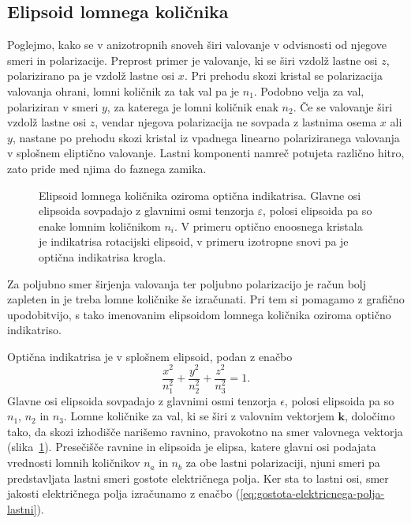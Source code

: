 \subsection*{Elipsoid lomnega količnika}
Poglejmo, kako se v anizotropnih snoveh širi valovanje v odvisnosti
od njegove smeri in polarizacije. Preprost primer je valovanje, ki se širi vzdolž lastne
osi $z$, polarizirano pa je vzdolž lastne osi $x$. Pri prehodu
skozi kristal se polarizacija valovanja ohrani, lomni količnik za
tak val pa je $n_{1}$. Podobno velja za val, polariziran v smeri
$y$, za katerega je lomni količnik enak $n_{2}$. Če se valovanje širi vzdolž lastne
osi $z$, vendar njegova polarizacija ne sovpada z lastnima osema
$x$ ali $y$, nastane po prehodu skozi kristal iz vpadnega linearno polariziranega valovanja
v splošnem eliptično valovanje. Lastni komponenti namreč potujeta različno
hitro, zato pride med njima do faznega zamika.

\begin{figure}[h]
\centering
\def\svgwidth{50truemm} 

\caption{Elipsoid lomnega količnika oziroma optična indikatrisa. Glavne osi
elipsoida sovpadajo z glavnimi osmi tenzorja $\varepsilon$, polosi elipsoida pa so enake
lomnim količnikom $n_i$. V primeru optično enoosnega kristala je indikatrisa  
rotacijski elipsoid, v primeru izotropne snovi pa je optična indikatrisa krogla.}
\label{fig:Indikatrisa}
\end{figure}

Za poljubno smer širjenja valovanja ter poljubno polarizacijo je račun
bolj zapleten in je treba lomne količnike še izračunati. Pri tem si pomagamo 
z grafično upodobitvijo, s tako imenovanim elipsoidom lomnega količnika oziroma
optično indikatriso. 

Optična indikatrisa je v splošnem elipsoid, podan z enačbo
\begin{equation}
\frac{x^{2}}{n_{1}^{2}}+\frac{y^{2}}{n_{2}^{2}}+\frac{z^{2}}{n_{3}^{2}}=1.
\end{equation}
Glavne osi elipsoida sovpadajo z glavnimi osmi tenzorja $\epsilon$, 
polosi elipsoida pa so $n_{1}$, $n_{2}$ in $n_{3}$. 
Lomne količnike za val, ki se širi z valovnim vektorjem $\mathbf{k}$, določimo tako, da
skozi izhodišče narišemo ravnino, pravokotno na smer valovnega vektorja (slika~\ref{fig:Indikatrisa}).
Presečišče ravnine in elipsoida je elipsa, katere glavni osi podajata
vrednosti lomnih količnikov $n_{a}$ in $n_{b}$ za obe lastni polarizaciji,
njuni smeri pa predstavljata lastni smeri gostote električnega polja. Ker
sta to lastni osi, smer jakosti električnega polja izračunamo z
enačbo (\ref{eq:gostota-elektricnega-polja-lastni}).

